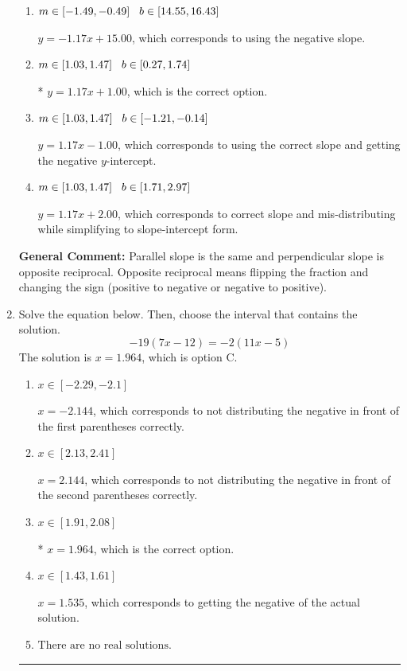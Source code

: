 \documentclass{extbook}[14pt]
\newcommand{\litem}[1]{\item #1

\rule{\textwidth}{0.4pt}}
\begin{document}
\begin{enumerate}
{\begin{enumerate}[label=\Alph*.]
 $y = 0.86x + 1.00$, which corresponds to using the reciprocal slope $(1/m)$.
\item \( m \in [-1.49, -0.49] \hspace*{3mm} b \in [14.55, 16.43] \)

 $y = -1.17x + 15.00$, which corresponds to using the negative slope.
\item \( m \in [1.03, 1.47] \hspace*{3mm} b \in [0.27, 1.74] \)

* $y = 1.17x + 1.00$, which is the correct option.
\item \( m \in [1.03, 1.47] \hspace*{3mm} b \in [-1.21, -0.14] \)

 $y = 1.17x - 1.00$, which corresponds to using the correct slope and getting the negative $y$-intercept.
\item \( m \in [1.03, 1.47] \hspace*{3mm} b \in [1.71, 2.97] \)

 $y = 1.17x + 2.00$, which corresponds to correct slope and mis-distributing while simplifying to slope-intercept form.
\end{enumerate}

\textbf{General Comment:} Parallel slope is the same and perpendicular slope is opposite reciprocal. Opposite reciprocal means flipping the fraction and changing the sign (positive to negative or negative to positive).
}
\litem{
Solve the equation below. Then, choose the interval that contains the solution.
\[ -19(7x -12) = -2(11x -5) \]The solution is \( x = 1.964 \), which is option C.\begin{enumerate}[label=\Alph*.]
\item \( x \in [-2.29, -2.1] \)

$x = -2.144$, which corresponds to not distributing the negative in front of the first parentheses correctly.
\item \( x \in [2.13, 2.41] \)

$x = 2.144$, which corresponds to not distributing the negative in front of the second parentheses correctly.
\item \( x \in [1.91, 2.08] \)

* $x = 1.964$, which is the correct option.
\item \( x \in [1.43, 1.61] \)

$x = 1.535$, which corresponds to getting the negative of the actual solution.
\item \( \text{There are no real solutions.} \)


\end{enumerate}}
\end{enumerate}
\end{document}
